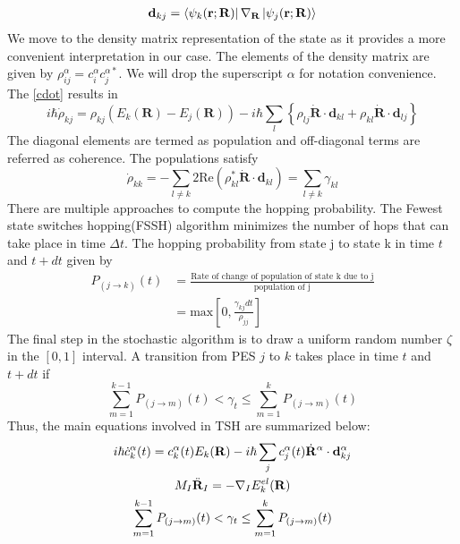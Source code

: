      \begin{align}
        \mathbf{d}_{kj} = \bra{\psi_k(\mathbf{r};\mathbf{R})}\nabla_{\mathbf{R}}\ket{\psi_j(\mathbf{r};\mathbf{R})}
     \end{align}
     We move to the density matrix representation of the state as it provides a more convenient interpretation in our case. The elements of the density matrix are given by $\rho_{ij}^\alpha = c^\alpha_ic^{\alpha*}_j$. We will drop the superscript $\alpha$ for notation convenience. The \eqref{cdot} results in
     \begin{equation}
         i\hbar\Dot{\rho}_{kj} = \rho_{kj}\left(E_k(\mathbf{R})-E_j(\mathbf{R})\right) - i\hbar\sum_l \left\{\rho_{lj}\Dot{\mathbf{R}}\cdot\mathbf{d}_{kl} + \rho_{kl}\Dot{\mathbf{R}}\cdot\mathbf{d}_{lj}\right\}
     \end{equation}
     The diagonal elements are termed as population and      off-diagonal terms are referred as coherence. The populations satisfy 
     \begin{equation}
         \Dot{\rho}_{kk} = -\sum_{l\neq k} 2\text{Re}(\rho_{kl}^*\Dot{\mathbf{R}}\cdot\mathbf{d}_{kl}) = \sum_{l\neq k}\gamma_{kl}
     \end{equation}
     There are multiple approaches to compute the hopping probability. The Fewest state switches hopping(FSSH) algorithm minimizes the number of hops that can take place in time $\Delta t$. The hopping probability from state j to state k in time $t$ and $t+dt$ given by
     \begin{align}\label{hopping_probability}
         P_{(j\rightarrow k)}(t) &= \frac{\text{Rate of change of population of state k due to j}}{\text{population of j}} \nonumber \\
         &= \text{max}\left[0, \frac{\gamma_{kj}dt }{\rho_{jj}}\right]
     \end{align}
     The final step in the stochastic algorithm is to draw a uniform random number $\zeta$ in the $[0,1]$ interval. A transition from PES $j$ to $k$ takes place in time $t$ and $t+dt$ if 
     \begin{equation}
         \sum_{m=1}^{k-1} P_{(j\rightarrow m)}(t) < \gamma_t \leq \sum_{m=1}^k P_{(j\rightarrow m)}(t)
     \end{equation}
     Thus, the main equations involved in TSH are summarized below:
     \begin{gather}
         i\hbar \Dot{c}_k^\alpha(t) = c_k^\alpha(t)E_k(\mathbf{R}) - i\hbar\sum_j c_j^\alpha(t)\Dot{\mathbf{R}}^\alpha\cdot\mathbf{d}^\alpha_{kj} \label{electroni_coeffs} \\
         M_I\Ddot{\mathbf{R}}_I = -\nabla_IE^{el}_k(\mathbf{R}) \label{nuclear_dynamics}\\
         \sum_{m=1}^{k-1} P_{(j\rightarrow m)}(t) < \gamma_t \leq \sum_{m=1}^k P_{(j\rightarrow m)}(t) \label{stochastic_algo}
     \end{gather}
